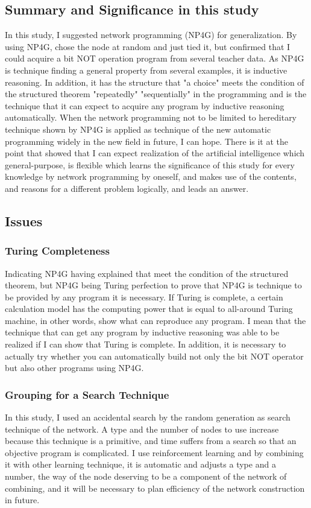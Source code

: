 \documentclass{article}
\begin{document}
\subsection {Summary and Significance in this study}
In this study, I suggested network programming (NP4G) for generalization.
By using NP4G, chose the node at random and just tied it, but confirmed that I could acquire a bit NOT operation program from several teacher data.
As NP4G is technique finding a general property from several examples, it is inductive reasoning.
In addition, it has the structure that "a choice" meets the condition of the structured theorem "repeatedly" "sequentially" in the programming and is the technique that it can expect to acquire any program by inductive reasoning automatically.
When the network programming not to be limited to hereditary technique shown by NP4G is applied as technique of the new automatic programming widely in the new field in future, I can hope.
There is it at the point that showed that I can expect realization of the artificial intelligence which general-purpose, is flexible which learns the significance of this study for every knowledge by network programming by oneself, and makes use of the contents, and reasons for a different problem logically, and leads an answer.

\subsection {Issues}
\subsubsection {Turing Completeness}
Indicating NP4G having explained that meet the condition of the structured theorem, but NP4G being Turing perfection to prove that NP4G is technique to be provided by any program it is necessary.
If Turing is complete, a certain calculation model has the computing power that is equal to all-around Turing machine, in other words, show what can reproduce any program.
I mean that the technique that can get any program by inductive reasoning was able to be realized if I can show that Turing is complete.
In addition, it is necessary to actually try whether you can automatically build not only the bit NOT operator but also other programs using NP4G.

\subsubsection {Grouping for a Search Technique}
In this study, I used an accidental search by the random generation as search technique of the network.
A type and the number of nodes to use increase because this technique is a primitive, and time suffers from a search so that an objective program is complicated.
I use reinforcement learning and by combining it with other learning technique, it is automatic and adjusts a type and a number, the way of the node deserving to be a component of the network of combining, and it will be necessary to plan efficiency of the network construction in future.
\end{document}
